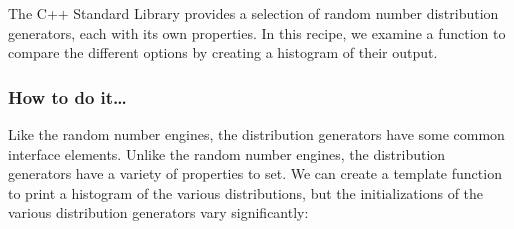 
The C++ Standard Library provides a selection of random number distribution generators, each with its own properties. In this recipe, we examine a function to compare the different options by creating a histogram of their output.

\subsubsection{How to do it…}

Like the random number engines, the distribution generators have some common interface elements. Unlike the random number engines, the distribution generators have a variety of properties to set. We can create a template function to print a histogram of the various distributions, but the initializations of the various distribution generators vary significantly:

